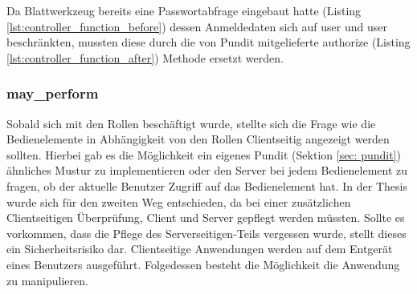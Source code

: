\begin{minipage}{\textwidth}
	
\end{minipage}

Da Blattwerkzeug bereits eine Passwortabfrage eingebaut hatte (Listing \ref{lst:controller_function_before}) dessen Anmeldedaten sich auf user und user beschränkten, mussten diese durch die von Pundit mitgelieferte authorize (Listing \ref{lst:controller_function_after}) Methode ersetzt werden.

\begin{minipage}{\linewidth}
	
\end{minipage}

\begin{minipage}{\linewidth}
	
\end{minipage}

\subsubsection{may\_perform}
Sobald sich mit den Rollen beschäftigt wurde, stellte sich die Frage wie die Bedienelemente in Abhängigkeit von den Rollen Clientseitig angezeigt werden sollten. Hierbei gab es die Möglichkeit ein eigenes Pundit (Sektion \ref{sec: pundit}) ähnliches Mustur zu implementieren oder den Server bei jedem Bedienelement zu fragen, ob der aktuelle Benutzer Zugriff auf das Bedienelement hat. In der Thesis wurde sich für den zweiten Weg entschieden, da bei einer zusätzlichen Clientseitigen Überprüfung, Client und Server gepflegt werden müssten. Sollte es vorkommen, dass die Pflege des Serverseitigen-Teils vergessen wurde, stellt dieses ein Sicherheitsrisiko dar. Clientseitige Anwendungen werden auf dem Entgerät eines Benutzers ausgeführt. Folgedessen besteht die Möglichkeit die Anwendung zu manipulieren.

